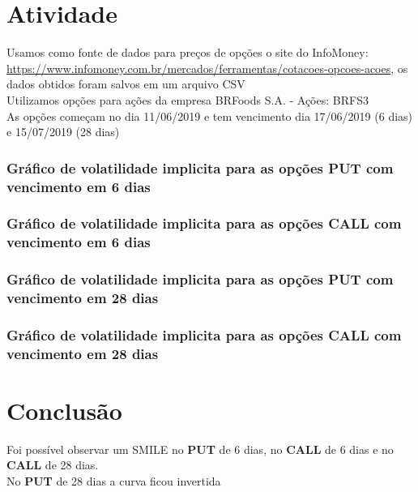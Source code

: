 \documentclass[
	11pt,				%
	openright,			%
	oneside,			%
	a4paper,			%
	english,			%
	french,				%
	spanish,			%
	brazil,				%
	]{abntex2}
\begin{document}
\chapter{Atividade}
Usamos como fonte de dados para preços de opções o site do InfoMoney: \url{https://www.infomoney.com.br/mercados/ferramentas/cotacoes-opcoes-acoes}, os dados obtidos foram salvos em um arquivo CSV\\
Utilizamos opções para ações da empresa BRFoods S.A. - Ações: BRFS3\\
As opções começam no dia 11/06/2019 e tem vencimento dia 17/06/2019 (6 dias) e 15/07/2019 (28 dias)

\subsection{Gráfico de volatilidade implicita para as opções PUT com vencimento em 6 dias}
\begin{figure}[h]
\end{figure}

\newpage
\subsection{Gráfico de volatilidade implicita para as opções CALL com vencimento em 6 dias}
\begin{figure}[h]
\end{figure}

\newpage
\subsection{Gráfico de volatilidade implicita para as opções PUT com vencimento em 28 dias}
\begin{figure}[h]
\end{figure}

\newpage
\subsection{Gráfico de volatilidade implicita para as opções CALL com vencimento em 28 dias}
\begin{figure}[h]
\end{figure}

\chapter{Conclusão}
Foi possível observar um SMILE no \textbf{PUT} de 6 dias, no \textbf{CALL} de 6 dias e no \textbf{CALL} de 28 dias.\\
No \textbf{PUT} de 28 dias a curva ficou invertida
\end{document}
